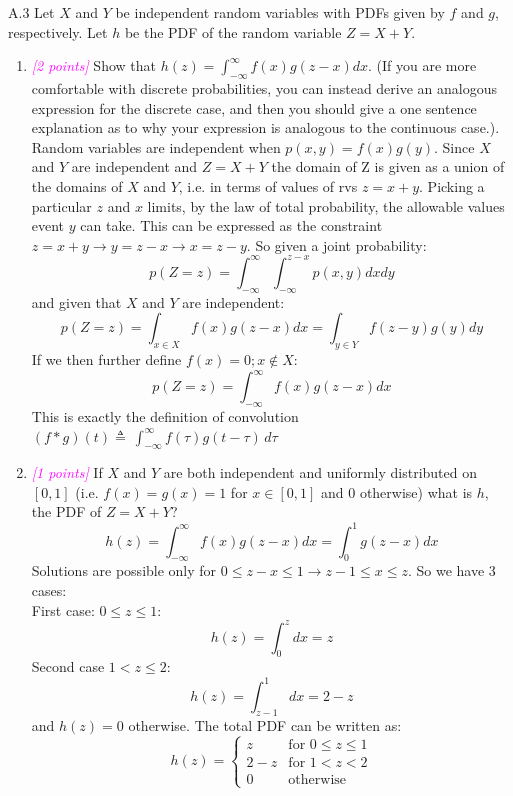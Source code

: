 \documentclass{article}
\newcommand{\1}{\mathbf{1}}
\newcommand{\points}[1]{\small\textcolor{magenta}{\emph{[#1 points]}} \normalsize}
\begin{document}
\newpage
A.3 Let $X$ and $Y$ be independent random variables with PDFs given by $f$ and $g$, respectively. Let $h$ be the PDF of the random variable $Z = X+Y$.
\begin{enumerate}
	\item \points{2} Show that $h(z) = \int_{-\infty}^\infty f(x) g( z - x ) d x $.  (If you are more comfortable with discrete probabilities, you can instead derive an analogous expression for the discrete case,  and then you should give a one sentence explanation as to why your expression is analogous to the continuous case.). \\
	Random variables are independent when $p(x,y) = f(x)g(y)$. Since $X$ and $Y$ are independent and $Z=X+Y$ the domain of Z is given as a union of the domains of $X$ and $Y$, i.e. in terms of values of rvs $z=x+y$. Picking a particular $z$ and $x$ limits, by the law of total probability, the allowable values event $y$ can take. This can be expressed as the constraint $z=x+y \rightarrow y=z-x \rightarrow x=z-y$. So given a joint probability: 
	$$p(Z=z) = \int_{-\infty}^\infty\int_{-\infty}^{z-x} p(x,y)dxdy$$
	and given that $X$ and $Y$ are independent: 
	$$p(Z=z) = \int_{x\in X} f(x)g(z-x)dx = \int_{y\in Y} f(z-y)g(y)dy$$
	If we then further define $f(x)=0; x\not\in X$:
	$$p(Z=z) =  \int_{-\infty}^\infty f(x)g(z-x)dx $$
	This is exactly the definition of convolution $(f * g)(t) \triangleq\ \int_{-\infty}^\infty f(\tau) g(t - \tau) \, d\tau$

	\item \points{1} If $X$ and $Y$ are both independent and uniformly distributed on $[0,1]$ (i.e. $f(x)=g(x)=1$ for $x \in [0,1]$ and $0$ otherwise) what is $h$, the PDF of $Z=X+Y$? \\
    $$h(z) = \int_{-\infty}^\infty f(x)g(z-x)dx = \int_0^1g(z-x)dx$$
    Solutions are possible only for $0 \leq z-x \leq 1 \rightarrow z-1 \leq x \leq z$. So we have 3 cases:\\ First case: $0\leq z\leq 1$:
    $$h(z) = \int_0^zdx = z$$
    Second case $1 < z \leq 2$: 
    $$h(z) = \int_{z-1}^1dx = 2-z$$
    and $h(z)=0$ otherwise. The total PDF can be written as: 
    $$h(z) = \begin{cases} 
              z &\mbox{for } 0 \leq z \leq 1 \\ 
              2-z &\mbox{for } 1 < z < 2 \\
              0 &\mbox{otherwise } 
              \end{cases} 
    $$ 
    
\end{enumerate}
\end{document}
